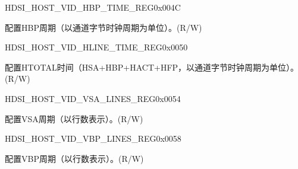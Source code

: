     
    \begin{register}{H}{DSI\_HOST\_VID\_HBP\_TIME\_REG}{0x004C}\label{regdesc:DSIHOSTVIDHBPTIMEREG}
    \regnewline%
    \begin{regdesc}\begin{reglist}
    \label{fielddesc:DSIHOSTVIDHBPTIME}\item [DSI\_HOST\_VID\_HBP\_TIME] 配置HBP周期（以通道字节时钟周期为单位）。(R/W)
    \end{reglist}\end{regdesc}
    \end{register}
    
    
    \begin{register}{H}{DSI\_HOST\_VID\_HLINE\_TIME\_REG}{0x0050}\label{regdesc:DSIHOSTVIDHLINETIMEREG}
    \regnewline%
    \begin{regdesc}\begin{reglist}
    \label{fielddesc:DSIHOSTVIDHLINETIME}\item [DSI\_HOST\_VID\_HLINE\_TIME] 配置HTOTAL时间（HSA+HBP+HACT+HFP，以通道字节时钟周期为单位）。(R/W)
    \end{reglist}\end{regdesc}
    \end{register}
    
    
    \begin{register}{H}{DSI\_HOST\_VID\_VSA\_LINES\_REG}{0x0054}\label{regdesc:DSIHOSTVIDVSALINESREG}
    \regnewline%
    \begin{regdesc}\begin{reglist}
    \label{fielddesc:DSIHOSTVSALINES}\item [DSI\_HOST\_VSA\_LINES] 配置VSA周期（以行数表示）。(R/W)
    \end{reglist}\end{regdesc}
    \end{register}
    
    
    \begin{register}{H}{DSI\_HOST\_VID\_VBP\_LINES\_REG}{0x0058}\label{regdesc:DSIHOSTVIDVBPLINESREG}
    \regnewline%
    \begin{regdesc}\begin{reglist}
    \label{fielddesc:DSIHOSTVBPLINES}\item [DSI\_HOST\_VBP\_LINES] 配置VBP周期（以行数表示）。(R/W)
    \end{reglist}\end{regdesc}
    \end{register}
    

